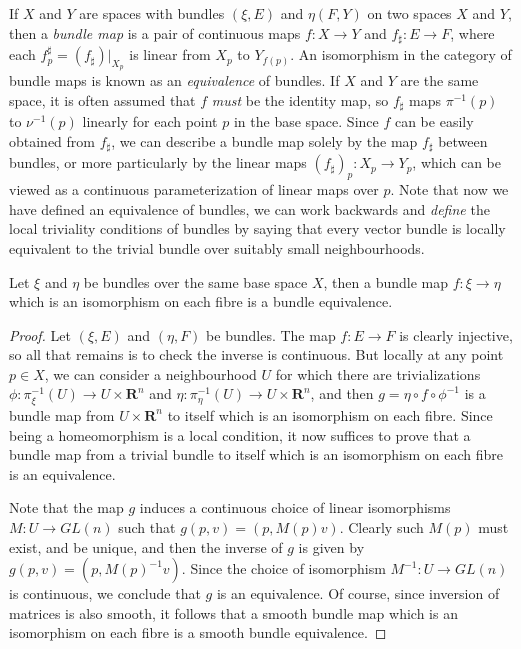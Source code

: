 If $X$ and $Y$ are spaces with bundles $(\xi,E)$ and $\eta(F,Y)$ on two spaces $X$ and $Y$, then a \emph{bundle map} is a pair of continuous maps $f: X \to Y$ and $f_\sharp: E \to F$, where each $f^\sharp_p = (f_\sharp)|_{X_p}$ is linear from $X_p$ to $Y_{f(p)}$. An isomorphism in the category of bundle maps is known as an \emph{equivalence} of bundles. If $X$ and $Y$ are the same space, it is often assumed that $f$ {\it must} be the identity map, so $f_\sharp$ maps $\pi^{-1}(p)$ to $\nu^{-1}(p)$ linearly for each point $p$ in the base space. Since $f$ can be easily obtained from $f_\sharp$, we can describe a bundle map solely by the map $f_\sharp$ between bundles, or more particularly by the linear maps $(f_\sharp)_p: X_p \to Y_p$, which can be viewed as a continuous parameterization of linear maps over $p$. Note that now we have defined an equivalence of bundles, we can work backwards and {\it define} the local triviality conditions of bundles by saying that every vector bundle is locally equivalent to the trivial bundle over suitably small neighbourhoods.

\begin{theorem}
    Let $\xi$ and $\eta$ be bundles over the same base space $X$, then a bundle map $f: \xi \to \eta$ which is an isomorphism on each fibre is a bundle equivalence.
\end{theorem}
\begin{proof}
    Let $(\xi,E)$ and $(\eta,F)$ be bundles. The map $f: E \to F$ is clearly injective, so all that remains is to check the inverse is continuous. But locally at any point $p \in X$, we can consider a neighbourhood $U$ for which there are trivializations $\phi: \pi_\xi^{-1}(U) \to U \times \mathbf{R}^n$ and $\eta: \pi_\eta^{-1}(U) \to U \times \mathbf{R}^n$, and then $g = \eta \circ f \circ \phi^{-1}$ is a bundle map from $U \times \mathbf{R}^n$ to itself which is an isomorphism on each fibre. Since being a homeomorphism is a local condition, it now suffices to prove that a bundle map from a trivial bundle to itself which is an isomorphism on each fibre is an equivalence.

    Note that the map $g$ induces a continuous choice of linear isomorphisms $M: U \to GL(n)$ such that $g(p,v) = (p,M(p)v)$. Clearly such $M(p)$ must exist, and be unique, and then the inverse of $g$ is given by $g(p,v) = (p,M(p)^{-1} v)$. Since the choice of isomorphism $M^{-1}: U \to GL(n)$ is continuous, we conclude that $g$ is an equivalence. Of course, since inversion of matrices is also smooth, it follows that a smooth bundle map which is an isomorphism on each fibre is a smooth bundle equivalence.
\end{proof}

